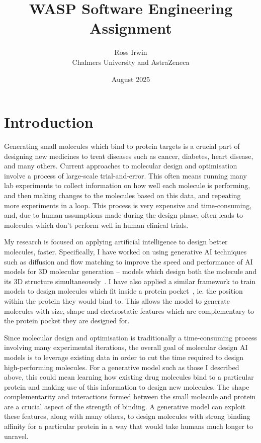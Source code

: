 \documentclass{article}
\title{WASP Software Engineering Assignment}
\author{Ross Irwin\\Chalmers University and AstraZeneca}
\date{August 2025}
\begin{document}
\maketitle


\section{Introduction}

Generating small molecules which bind to protein targets is a crucial part of designing new medicines to treat diseases such as cancer, diabetes, heart disease, and many others. Current approaches to molecular design and optimisation involve a process of large-scale trial-and-error. This often means running many lab experiments to collect information on how well each molecule is performing, and then making changes to the molecules based on this data, and repeating more experiments in a loop. This process is very expensive and time-consuming, and, due to human assumptions made during the design phase, often leads to molecules which don't perform well in human clinical trials.

My research is focused on applying artificial intelligence to design better molecules, faster. Specifically, I have worked on using generative AI techniques such as diffusion and flow matching to improve the speed and performance of AI models for 3D molecular generation -- models which design both the molecule and its 3D structure simultaneously~\cite{semlaflow}. I have also applied a similar framework to train models to design molecules which fit inside a protein pocket~\cite{flowr}, ie. the position within the protein they would bind to. This allows the model to generate molecules with size, shape and electrostatic features which are complementary to the protein pocket they are designed for.

Since molecular design and optimisation is traditionally a time-consuming process involving many experimental iterations, the overall goal of molecular design AI models is to leverage existing data in order to cut the time required to design high-performing molecules. For a generative model such as those I described above, this could mean learning how existing drug molecules bind to a particular protein and making use of this information to design new molecules. The shape complementarity and interactions formed between the small molecule and protein are a crucial aspect of the strength of binding. A generative model can exploit these features, along with many others, to design molecules with strong binding affinity for a particular protein in a way that would take humans much longer to unravel.
\end{document}
